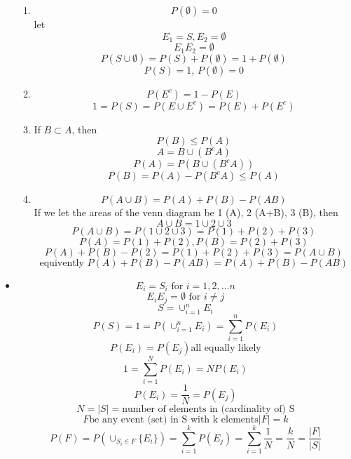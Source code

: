 \begin{itemize}
\begin{enumerate}
                  \item \[P(\emptyset) = 0\]
                        let \[E_1 = S, E_2 = \emptyset \]
                        \[ E_1 E_2 = \emptyset\]
                        \[ P(S\cup \emptyset) = P(S) + P(\emptyset) = 1 + P(\emptyset)\]
                        \[ P(S) = 1 , \, P(\emptyset) = 0\]
                  \item \[ P(E^c) = 1 - P(E)\]
                        \[ 1 = P(S) = P(E\cup E^c ) = P(E) + P(E^c)\]
                  \item If $B \subset A$, then
                        \[ P(B) \leq P(A)\]
                        \[ A = B \cup (B^c A)\]
                        \[ P(A) = P(B \cup (B^c A))\]
                        \[ P(B) = P(A) - P(B^c A) \leq P(A)\]
                  \item \[ P(A \cup B) = P(A) + P(B) - P(AB)\]
                        If we let the areas of the venn diagram  be 1 (A), 2 (A+B), 3 (B), then
                        \[ A \cup B = 1 \cup 2 \cup 3\]
                        \[ P(A\cup B) = P(1 \cup 2 \cup 3) = P(1) + P(2) + P(3)\]
                        \[ P(A) = P(1) + P(2), P(B) = P(2) + P(3)\]
                        \[ P(A) + P(B) - P(2)  = P(1) + P(2) + P(3) = P(A \cup B)\]
                        \[ \text{equivently } P(A) + P(B) - P(AB) = P(A) + P(B) - P(AB) \]
            \end{enumerate}
      \item \[ E_i = S_i \text{ for } i = 1, 2, ... n\]
            \[ E_i E_j = \emptyset \text{ for } i \neq j\]
            \[ S = \cup_{i=1}^{n} E_i\]
            \[ P(S) = 1 = P(\cup_{i=1}^{n} E_i) = \sum_{i=1}^{n} P(E_i)\]
            \[ P (E_i) = P(E_j) \text{all equally likely}\]
            \[ 1 = \sum_{i=1}^{N} P(E_i) = N P(E_i)\]
            \[ P(E_i) = \frac{1}{N} = P(E_j)\]
            \[ N = |S| = \text{number of elements in (cardinality of) S}\]
            \[ F \text{be any event (set) in S with k elements} |F| = k\]
            \[ P(F) = P(\cup_{S_i \in F} \{E_i\}) = \sum_{i=1}^{k} P(E_j) = \sum_{i=1}^{k} \frac{1}{N} = \frac{k}{N} = \frac{|F|}{|S|}\]


\end{itemize}
